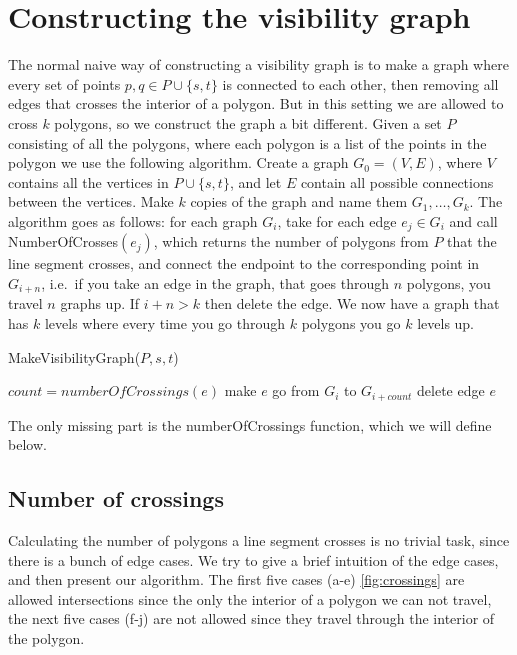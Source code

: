 \section{Constructing the visibility graph}
The normal naive way of constructing a visibility graph is to make a graph
where every set of points $p,q \in P\cup \{s,t\}$ is connected to each other,
then removing all edges that crosses the interior of a polygon. But in this
setting we are allowed to cross $k$ polygons, so we construct the graph a bit
different. Given a set $P$ consisting of all the polygons, where each polygon
is a list of the points in the polygon we use the following algorithm.  Create
a graph $G_0=(V,E)$, where $V$ contains all the vertices in $P\cup \{s,t\}$,
and let $E$ contain all possible connections between the vertices. Make $k$
copies of the graph and name them $G_1,\dots,G_{k}$.  The algorithm goes as
follows: for each graph $G_i$, take for each edge $e_j\in G_i$ and call
NumberOfCrosses$(e_j)$, which returns the number of polygons from $P$ that the
line segment crosses, and connect the endpoint to the corresponding point in
$G_{i+n}$, i.e.\ if you take an edge in the graph, that goes through $n$
polygons, you travel $n$ graphs up. If $i+n>k$ then delete the edge. We now
have a graph that has $k$ levels where every time you go through $k$ polygons
you go $k$ levels up.

\begin{algorithm} 
	\caption{MakeVisibilityGraph($P,s,t$)}
	\begin{algorithmic}[1]
			\State $count = numberOfCrossings(e)$
				\State make $e$ go from $G_i$ to $G_{i+count}$
			\Else
				\State delete edge $e$
			\EndIf
		\EndFor
		\EndFor
	\end{algorithmic}
\end{algorithm}

The only missing part is the numberOfCrossings function, which we will define
below.

\subsection{Number of crossings}
Calculating the number of polygons a line segment crosses is no trivial task,
since there is a bunch of edge cases. We try to give a brief intuition of the
edge cases, and then present our algorithm.
The first five cases (a-e) \ref{fig:crossings} are allowed intersections since
the only the interior of a polygon we can not travel, the
next five cases (f-j) are not allowed since they travel through the interior
of the polygon.

